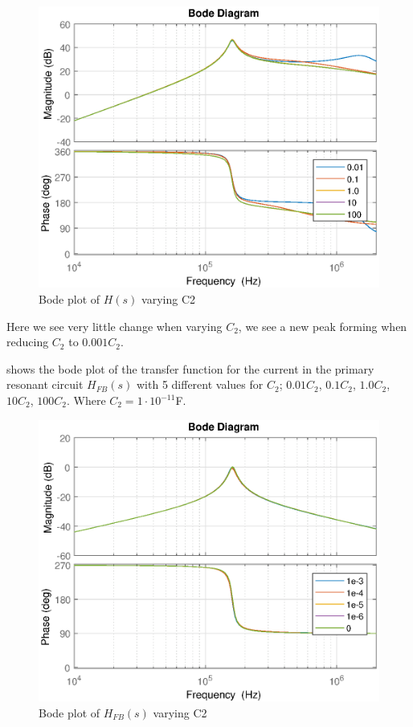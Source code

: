 \begin{figure}[H]
    \centering
    \includegraphics[width=\textwidth]{img/CoilRigBode_C2.eps}
    \caption{Bode plot of $H(s)$ varying C2}
    \label{fig:bode_c2}
\end{figure}

Here we see very little change when varying $C_2$, we see a new peak forming when reducing $C_2$ to $0.001 C_2$.

 shows the bode plot of the transfer function for the current in the primary resonant circuit $H_{FB}(s)$ with 5 different values for $C_2$; $0.01C_2$, $0.1C_2$, $1.0C_2$, $10C_2$, $100C_2$. Where $C_2 = 1 \cdot 10^{-11}$F.
\begin{figure}[H]
    \centering
    \includegraphics[width=\textwidth]{img/FeedBackBode_C2.eps}
    \caption{Bode plot of $H_{FB}(s)$ varying C2}
    \label{fig:fbbode_c2}
\end{figure}


